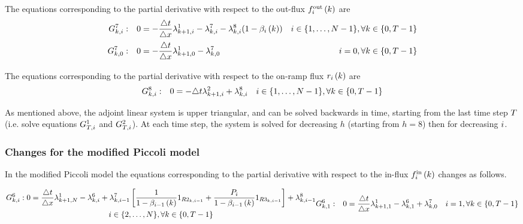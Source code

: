 The equations corresponding to the partial derivative with respect to the out-flux $f_{i}^{\text{out}}\left(k\right)$ are
%
\begin{subequations}
\begin{align}
G^{7}_{k, i}: && 0 &= - \frac{\triangle t}{\triangle x} \lambda^{1}_{k+1, i} - \lambda^{7}_{k, i} - \lambda^{8}_{k, i}  (1 - \beta_{i}\left(k\right))
& i \in \{1, \dots, N - 1\}, \forall k \in \{0, T - 1\}
\label{eq:}
\\
G^{7}_{k, 0}: && 0 &= - \frac{\triangle t}{\triangle x} \lambda^{1}_{k+1, 0} - \lambda^{7}_{k, 0}
& i = 0, \forall k \in \{0, T - 1\}
\label{eq:}
\end{align}
\end{subequations}

The equations corresponding to the partial derivative with respect to the on-ramp flux $r_{i}\left(k\right)$ are
%
\begin{align}
G^{8}_{k, i}: && 0 &= - \triangle t \lambda^{2}_{k+1, i} + \lambda^{8}_{k, i}
& i \in \{1, \dots, N - 1\}, \forall k \in \{0, T - 1\}
\label{eq:}
\end{align}

As mentioned above, the adjoint linear system is upper triangular, and can be solved backwards in time, starting from the last time step $T$ (i.e. solve equations $G^{1}_{T, i}$ and $G^{2}_{T, i}$). At each time step, the system is solved for decreasing $h$ (starting from $h=8$) then for decreasing $i$.

\subsubsection{Changes for the modified Piccoli model}
In the modified Piccoli model the equations corresponding to the partial derivative with respect to the in-flux $f_{i}^{\text{in}}\left(k\right)$ changes as follows.
%
\setcounter{equation}{5}

\begin{subequations}
\begin{multline}
\stdG{6}: 0 = \frac{\deltat}{\deltax} \Lambd{1}{\itime+1}{\ncell} - \Lambd{6}{\itime}{\icell} + \Lambd{7}{\itime}{\icell-1} \left[ \frac{1}{1-\offrampratio{\icell - 1}{\itime}} 1_{\R{2}{\itime}{\icell-1}} +  \frac{\priority{\icell}}{1-\offrampratio{\icell - 1}{\itime}} 1_{\R{3}{\itime}{\icell-1}} \right] + \Lambd{8}{\itime}{\icell-1}
\\ \icell \in \{2, \dots, \ncell \}, \forall \itime \in \{0, \ntime - 1\}
\end{multline}
%
\begin{align}
\G{6}{\itime}{1}: && 0 = \frac{\deltat}{\deltax} \Lambd{1}{\itime+1}{1} - \Lambd{6}{\itime}{1} + \Lambd{7}{\itime}{0}
&& \icell = 1, \forall \itime \in \{0, \ntime - 1\}
\end{align}
\end{subequations}

